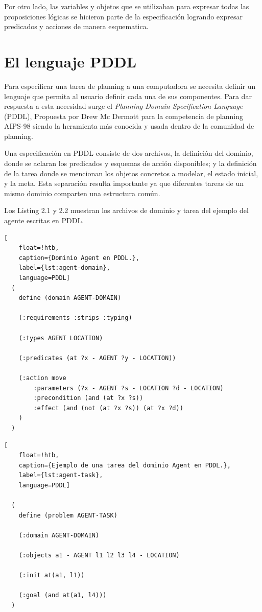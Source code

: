 Por otro lado, las variables y objetos que se utilizaban para expresar todas las
proposiciones lógicas se hicieron parte de la especificación logrando expresar
predicados y acciones de manera esquematica.

\section{El lenguaje PDDL}

Para especificar una tarea de planning a una computadora se necesita definir un
lenguaje que permita al usuario definir cada una de sus componentes. Para dar
respuesta a esta necesidad surge el \emph{Planning Domain Specification
Language} (PDDL), Propuesta por Drew Mc Dermott para la competencia de planning
AIPS-98 \citep{McDermott1998} siendo la heramienta más conocida y usada dentro
de la comunidad de planning.

Una especificación en PDDL consiste de dos archivos, la definición del dominio,
donde se aclaran los predicados y esquemas de acción disponibles; y la
definición de la tarea donde se mencionan los objetos concretos a modelar, el
estado inicial, y la meta. Esta separación resulta importante ya que diferentes
tareas de un mismo dominio comparten una estructura común.

Los Listing 2.1 y 2.2 muestran los archivos de dominio y tarea del ejemplo del
agente escritas en PDDL.

\begin{lstlisting}[
    float=!htb,
    caption={Dominio Agent en PDDL.},
    label={lst:agent-domain},
    language=PDDL]
  (
    define (domain AGENT-DOMAIN)

    (:requirements :strips :typing)

    (:types AGENT LOCATION)

    (:predicates (at ?x - AGENT ?y - LOCATION))

    (:action move
        :parameters (?x - AGENT ?s - LOCATION ?d - LOCATION)
        :precondition (and (at ?x ?s))
        :effect (and (not (at ?x ?s)) (at ?x ?d))
    )
  )
\end{lstlisting}

\begin{lstlisting}[
    float=!htb,
    caption={Ejemplo de una tarea del dominio Agent en PDDL.},
    label={lst:agent-task},
    language=PDDL]

  (
    define (problem AGENT-TASK)

    (:domain AGENT-DOMAIN)

    (:objects a1 - AGENT l1 l2 l3 l4 - LOCATION)

    (:init at(a1, l1))
    
    (:goal (and at(a1, l4)))
  )
\end{lstlisting}

